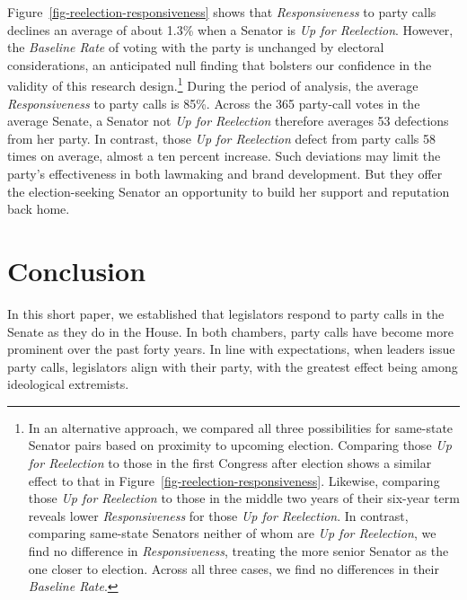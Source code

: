 \documentclass[12pt]{article}
\begin{document}
Figure~\ref{fig-reelection-responsiveness} shows that \textit{Responsiveness}
to party calls declines an average of about 1.3\% when a Senator is
\textit{Up for Reelection}.
However, the \textit{Baseline Rate} of voting with the party is unchanged by
electoral considerations, an anticipated null finding that bolsters our
confidence in the validity of this research design.\footnote{
  \doublespacing\normalsize
  In an alternative approach, we compared all three possibilities for
  same-state Senator pairs based on proximity to upcoming election.
  Comparing those \textit{Up for Reelection} to those in the first Congress
  after election shows a similar effect to that in
  Figure~\ref{fig-reelection-responsiveness}.
  Likewise, comparing those \textit{Up for Reelection} to those in the middle
  two years of their six-year term reveals lower \textit{Responsiveness} for
  those \textit{Up for Reelection}.
  In contrast, comparing same-state Senators neither of whom are
  \textit{Up for Reelection}, we find no difference in \textit{Responsiveness},
  treating the more senior Senator as the one closer to election.
  Across all three cases, we find no differences in their
  \textit{Baseline Rate}.}
During the period of analysis, the average \textit{Responsiveness} to party
calls is 85\%.
Across the 365 party-call votes in the average Senate, a Senator not
\textit{Up for Reelection} therefore averages 53 defections from her party.
In contrast, those \textit{Up for Reelection} defect from party calls 58 times
on average, almost a ten percent increase.
Such deviations may limit the party's effectiveness in both lawmaking and brand
development.
But they offer the election-seeking Senator an opportunity to build her support
and reputation back home.

\section*{Conclusion}

In this short paper, we established that legislators respond to party calls in
the Senate as they do in the House.
In both chambers, party calls have become more prominent over the past forty
years.
In line with expectations, when leaders issue party calls, legislators
align with their party, with the greatest effect being among ideological
extremists.
\end{document}
